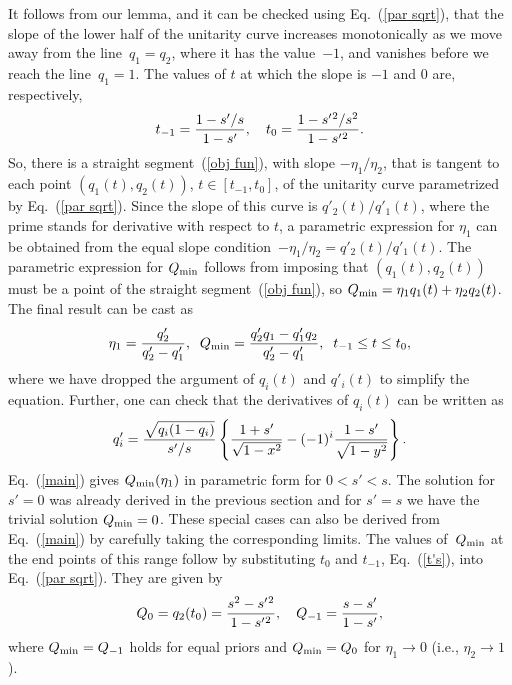 \documentclass[aps,pra,twocolumn,showpacs]{revtex4-1}
\begin{document}
{It follows from our lemma, and it can be checked using  Eq.~(\ref{par sqrt}), that the slope of the lower half of the unitarity curve increases monotonically as we move away from the line~$q_1=q_2$, where it has the value~$-1$, and vanishes before we reach the line~$q_1=1$. The values of $t$ at which the slope is $-1$ and $0$ are, respectively,
%
\begin{equation}
t_{-1}={1-s'/s\over 1-s'},\quad
t_0={1-s'{}^2/s^2\over 1-s'{}^{2}}.
\label{t's}
\end{equation}
%
So, there is a straight segment~(\ref{obj fun}), with slope $-\eta_1/\eta_2$, that is tangent to each point $(q_1(t),q_2(t))$, $t\in[t_{-1},t_0]$, of the unitarity curve parametrized by Eq.~(\ref{par sqrt}). Since the slope of this curve is $q'_2(t)/q'_1(t)$, where the prime stands for derivative with respect to $t$, a parametric expression for $\eta_1$ can be obtained from the equal slope condition~$-\eta_1/\eta_2=q'_2(t)/q'_1(t)$. The parametric expression for $Q_{\rm min}$ follows from imposing that $(q_1(t),q_2(t))$ must be a point of the straight segment~(\ref{obj fun}), so $Q_{\rm min}=\eta_1q_1(t)+\eta_2 q_2(t)$.
% 
The final result can be cast as
%
\begin{equation}
\eta_1={q'_2\over q'_2-q'_1},\;\; Q_{\rm min}={q'_2 q_1-q'_1 q_2\over q'_2-q'_1},\;\; t_{-1}\le t\le t_0,
\label{main}
\end{equation}
%
where we have dropped the argument of $q_i(t)$ and $q'_i(t)$ to simplify the equation. Further, one can check that the derivatives of $q_i(t)$ can be written as
%
\begin{equation}
q'_i={\sqrt{q_i(1-q_i)}\over s'/s}\left\{{1+s'\over\sqrt{1-x^2}}-(-1)^i{1-s'\over\sqrt{1-y^2}}\right\}.
\end{equation}
%
Eq.~(\ref{main}) gives $Q_{\rm min}(\eta_1)$ in parametric form for $0<s'<s$. The solution for $s'=0$ was already derived in the previous section and for $s'=s$ we have the trivial solution $Q_{\rm min}=0$. These special cases can also be derived from Eq.~(\ref{main}) by carefully taking the corresponding limits.
The values of~$Q_{\rm min}$ at the end points of this range follow by substituting $t_{0}$ and $t_{-1}$, Eq.~(\ref{t's}), into Eq.~(\ref{par sqrt}). They are given by
%
\begin{equation}
Q_{0}=q_2(t_0)={s^{2}-s'{}^{2}\over 1-s'{}^{2}},\quad
Q_{-1}={s-s'\over 1-s'},
\label{Q's}
\end{equation}
%
where $Q_{\rm min}=Q_{-1}$ holds for equal priors and $Q_{\rm min}=Q_0$ for $\eta_1\to 0$ (i.e., $\eta_2\to 1$).

}
\end{document}

